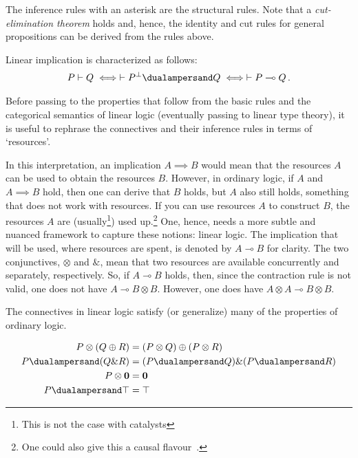     The inference rules with an asterisk are the structural rules. Note that a \textit{cut-elimination theorem} holds and, hence, the identity and cut rules for general propositions can be derived from the rules above.

    Linear implication is characterized as follows:
    \begin{gather}
        P\vdash Q \iff \vdash P^\perp\dualampersand Q \iff \vdash P\multimap Q\,.
    \end{gather}

    \begin{remark}
        Before passing to the properties that follow from the basic rules and the categorical semantics of linear logic (eventually passing to linear type theory), it is useful to rephrase the connectives and their inference rules in terms of `resources'.

        In this interpretation, an implication $A\implies B$ would mean that the resources $A$ can be used to obtain the resources $B$. However, in ordinary logic, if $A$ and $A\implies B$ hold, then one can derive that $B$ holds, but $A$ also still holds, something that does not work with resources. If you can use resources $A$ to construct $B$, the resources $A$ are (usually\footnote{This is not the case with catalysts}) used up.\footnote{One could also give this a causal flavour~\citep{girard_linear_1995}.} One, hence, needs a more subtle and nuanced framework to capture these notions: linear logic. The implication that will be used, where resources are spent, is denoted by $A\multimap B$ for clarity. The two conjunctives, $\otimes$ and $\&$, mean that two resources are available concurrently and separately, respectively. So, if $A\multimap B$ holds, then, since the contraction rule is not valid, one does not have $A\multimap B\otimes B$. However, one does have $A\otimes A\multimap B\otimes B$.
    \end{remark}

    The connectives in linear logic satisfy (or generalize) many of the properties of ordinary logic.
    \begin{property}[Distributivity]
        \begin{gather}
            \begin{aligned}
                P\otimes(Q\oplus R) &= (P\otimes Q)\oplus(P\otimes R)\\
                P\dualampersand(Q\& R) &= (P\dualampersand Q)\&(P\dualampersand R)\\
                P\otimes\mathbf{0} &= \mathbf{0}\\
                P\dualampersand\top &= \top
            \end{aligned}
        \end{gather}
    \end{property}

